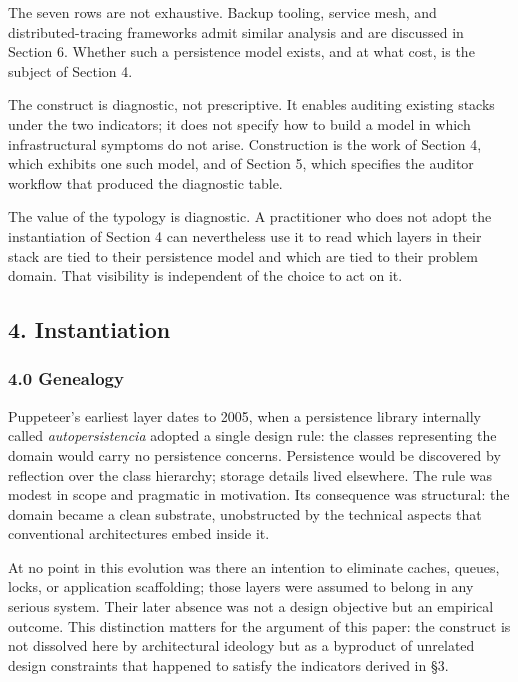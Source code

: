 \documentclass[
]{article}
\begin{document}
The seven rows are not exhaustive. Backup tooling, service mesh, and
distributed-tracing frameworks admit similar analysis and are discussed
in Section 6. Whether such a persistence model exists, and at what cost,
is the subject of Section 4.

The construct is diagnostic, not prescriptive. It enables auditing
existing stacks under the two indicators; it does not specify how to
build a model in which infrastructural symptoms do not arise.
Construction is the work of Section 4, which exhibits one such model,
and of Section 5, which specifies the auditor workflow that produced the
diagnostic table.

The value of the typology is diagnostic. A practitioner who does not
adopt the instantiation of Section 4 can nevertheless use it to read
which layers in their stack are tied to their persistence model and
which are tied to their problem domain. That visibility is independent
of the choice to act on it.

\subsection{4. Instantiation}\label{instantiation}

\subsubsection{4.0 Genealogy}\label{genealogy}

Puppeteer's earliest layer dates to 2005, when a persistence library
internally called \emph{autopersistencia} adopted a single design rule:
the classes representing the domain would carry no persistence concerns.
Persistence would be discovered by reflection over the class hierarchy;
storage details lived elsewhere. The rule was modest in scope and
pragmatic in motivation. Its consequence was structural: the domain
became a clean substrate, unobstructed by the technical aspects that
conventional architectures embed inside it.

At no point in this evolution was there an intention to eliminate
caches, queues, locks, or application scaffolding; those layers were
assumed to belong in any serious system. Their later absence was not a
design objective but an empirical outcome. This distinction matters for
the argument of this paper: the construct is not dissolved here by
architectural ideology but as a byproduct of unrelated design
constraints that happened to satisfy the indicators derived in §3.
\end{document}
